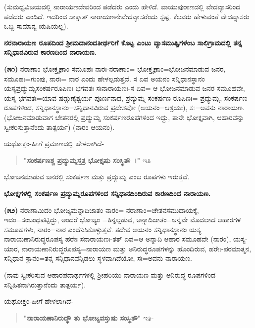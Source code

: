(ಸುಮಧ್ವವಿಜಯದಲ್ಲಿ ನಾರಾಯಣದೇವರಿಂದ ಪಡೆದರು ಎಂದು ಹೇಳಿದೆ. ವಾಯುಪುರಾಣದಲ್ಲಿ ವೇದವ್ಯಾಸರಿಂದ ಪಡೆದರು ಎಂದಿದೆ. ಇದರಿಂದ ಸಾಕ್ಷಾತ್ ನಾರಾಯಣನೇ\break ವೇದವ್ಯಾಸರೆಂದು ಸ್ಪಷ್ಟ. ಕೆಲವರು ಹೇಳುವಂತೆ ವೇದವ್ಯಾಸರು ಒಬ್ಬ ಸಾಮಾನ್ಯ ಋಷಿಯಲ್ಲ).

\begin{center}
\textbf{ನರನಾರಾಯಣ ರೂಪದಿಂದ ಶ‍್ರೀಮದಾನಂದತೀರ್ಥರಿಗೆ ಕೊಟ್ಟ ಎಂಟು ವ್ಯಾಸಮುಷ್ಟಿಗಳೆಂಬ ಸಾಲಿಗ್ರಾಮದಲ್ಲಿ ತನ್ನ ಸನ್ನಿಧಾನವಿರುವ ಕಾರಣದಿಂದ ನಾರಾಯಣ.}
\end{center}

\textbf{(೫೧)} ನರಾಣಾಂ ಭೋಕ್ತೄಣಾಂ ಸಮೂಹಃ ನಾರಃ-ನರಾಣಾಂ= ಭೋಕ್ತೄಣಾಂ=ಭೋಜನ\-ಮಾಡುವ ಜನರ, ಸಮೂಹಃ=ಗುಂಪು, ನಾರಃ= ನಾರ ಎಂದು ಹೇಳಲ್ಪಡುತ್ತದೆ. ಸ ಏವ ಅಯನಂ ಸನ್ನಿಧಾನಸ್ಥಾನಂ ಯಸ್ಯಪ್ರದ್ಯುಮ್ನಸಂಕರ್ಷರೂಪಿಣಃ ಭಗವತಃ ಸಃ\break ನಾರಾಯಣಃ-ಸ ಏವ= ಆ ಭೋಜನಮಾಡುವ ಜನರ ಸಮೂಹವೇ, ಯಸ್ಯ ಭಗವತಃ=ಯಾವ ಷಡ್ಗುಣೈಶ್ವರ್ಯ ಪೂರ್ಣನಾದ, ಪ್ರದ್ಯುಮ್ನ ಸಂಕರ್ಷಣ ರೂಪಿಣಃ= ಪ್ರದ್ಯುಮ್ನ, ಸಂಕರ್ಷಣ ರೂಪಗಳಿಂದ, ಸನ್ನಿಧಾನಸ್ಥಾನಂ=ಸನ್ನಿಧಾನವಿರುವ ಪ್ರದೇಶವೋ (ಅಯನಂ=ಆಶ್ರಯಃ), ಸಃ=ಅವನು ನಾರಾಯಣ. (ಭೋಜನಮಾಡುವಾಗ ಚೇತನರಲ್ಲಿ ಪ್ರದ್ಯುಮ್ನ ಸಂಕರ್ಷಣರೂಪಗಳಿಂದ ಇದ್ದು, ತಾನೇ ಭೋಕ್ತೃವಾಗಿ, ಆಹಾರವನ್ನು ಸ್ವೀಕರಿಸುತ್ತಾನೆಂದು ತಾತ್ಪರ್ಯ) (ನಾರಂ ಆಯನಂ).

ಯಥೋಕ್ತಂ-ಹೀಗೆ ಪ್ರಮಾಣದಲ್ಲಿ ಹೇಳಲಾಗಿದೆ-

\begin{verse}
\textbf{"ಸಂಕರ್ಷಣಶ್ಚ ಪ್ರದ್ಯುಮ್ನಸ್ತತ್ರ ಭೋಕ್ತೃಷು ಸಂಸ್ಥಿತೌ~।"} ಇತಿ
\end{verse}

\noindent
ಭೋಜನಮಾಡುವ ಜನರಲ್ಲಿ ಸಂಕರ್ಷಣ ಮತ್ತು ಪ್ರದ್ಯುಮ್ನ ಎಂಬ ರೂಪಗಳು ಇರುತ್ತವೆ.

\begin{center}
\textbf{ಭೋಕ್ತೃಗಳಲ್ಲಿ ಸಂಕರ್ಷಣ ಪ್ರದ್ಯುಮ್ನರೂಪಗಳಿಂದ ಸನ್ನಿಧಾನದಿಂದಿರುವ ಕಾರಣದಿಂದ ನಾರಾಯಣ.}
\end{center}

\textbf{(೫೨)} ನರಾಣಾಮಿದಂ ಭೋಜ್ಯಮನ್ನಾದಿಜಾತಂ ನಾರಂ= ನರಾಣಾಂ=ಚೇತನಸಮು\-ದಾಯಕ್ಕೆ, ಇದಂ=ಸಂಬಂಧಪಟ್ಟಿದ್ದು, ಅಂದರೆ ಭೋಜ್ಯಂ =ತಿನ್ನಲ್ಪಡುವ, ಅನ್ನಾದಿ\-ಜಾತಂ=\break ಅನ್ನವೇ ಮೊದಲಾದ ಆಹಾರಗಳ ಸಮೂಹಗಳು, ನಾರಂ=ನಾರ ಎಂದೆನಿಸಿಕೊಳ್ಳುತ್ತವೆ. ತದೇವ ಅಯನಂ ಸನ್ನಿಧಾನಸ್ಥಾನಂ ಯಸ್ಯ ನಾರಾಯಣಾನಿರುದ್ಧರೂಪಸ್ಯ ಹರೇಃ ಸ\break ನಾರಾಯಣಃ-ತತ್ ಏವ=ಆ ಅನ್ನಾದಿ ಆಹಾರ ಸಮೂಹವೇ (ನಾರಂ), ಯಸ್ಯ-ಯಾರ, ನಾರಾಯಣಾನಿರುದ್ಧರೂಪಸ್ಯ=ನಾರಾಯಣ ಮತ್ತು ಅನಿರುದ್ಧರೂಪಗಳನ್ನು ಹೊಂದಿರುವ, ಹರೇಃ-ಪರಮಾತ್ಮನ, ಸನ್ನಿಧಾನ ಸ್ಥಾನಂ=ತನ್ನ ಸನ್ನಿಧಾನವನ್ನಿಡಲು ಸ್ಥಳವಾಗಿದೆಯೋ, ಸಃ=\break ಅವನು ನಾರಾಯಣ.

(ನಾವು ಸ್ವೀಕರಿಸುವ ಆಹಾರಪದಾರ್ಥಗಳಲ್ಲಿ ಶ‍್ರೀಹರಿಯು ನಾರಾಯಣ ಮತ್ತು ಅನಿರುದ್ಧ ರೂಪಗಳಿಂದ ಸನ್ನಿಹಿತನಾಗಿರುತ್ತಾನೆಂದು ತಾತ್ಪರ್ಯ).

ಯಥೋಕ್ತಂ-ಹೀಗೆ ಹೇಳಲಾಗಿದೆ-

\begin{verse}
\textbf{"ನಾರಾಯಣಾನಿರುದ್ಧೌ ತು ಭೋಜ್ಯವಸ್ತುಷು ಸಂಸ್ಥಿತೌ"} ಇತಿ-
\end{verse}

